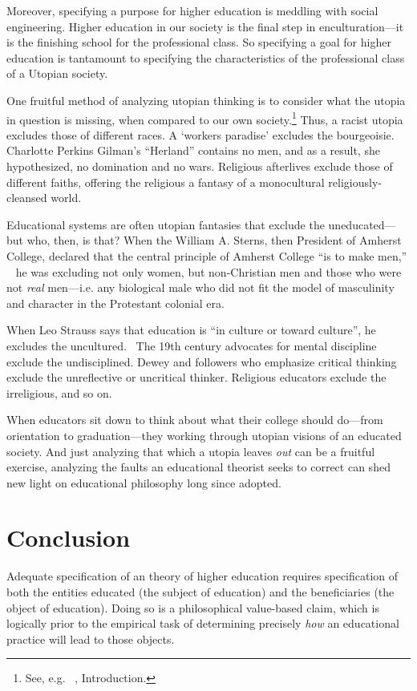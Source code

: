 Moreover, specifying a purpose for higher education is meddling with social engineering. Higher education in our society is the final step in enculturation---it is the finishing school for the professional class. So specifying a goal for higher education is tantamount to specifying the characteristics of the professional class of a Utopian society.

One fruitful method of analyzing utopian thinking is to consider what the utopia in question is missing, when compared to our own society.\footnote{See, e.g. ~\citep{Carey:2000tt}, Introduction.} Thus, a racist utopia excludes those of different races. A `workers paradise' excludes the bourgeoisie. Charlotte Perkins Gilman's ``Herland'' contains no men, and as a result, she hypothesized, no domination and no wars. Religious afterlives exclude those of different faiths, offering the religious a fantasy of a monocultural religiously-cleansed world. 

Educational systems are often utopian fantasies that exclude the uneducated---but who, then, is that? When the William A. Sterns, then President of Amherst College, declared that the central principle of Amherst College ``is to make men,'' ~\citep{Stearns:1859vm} he was excluding not only women, but non-Christian men and those who were not \emph{real} men---i.e. any biological male who did not fit the model of masculinity and character in the Protestant colonial era. 

When Leo Strauss says that education is ``in culture or toward culture'', he excludes the uncultured.~\citep{Strauss:INKysbQ_} The 19th century advocates for mental discipline exclude the undisciplined. Dewey and followers who emphasize critical thinking exclude the unreflective or uncritical thinker. Religious educators exclude the irreligious, and so on.

When educators sit down to think about what their college should do---from orientation to graduation---they working through utopian visions of an educated society. And just analyzing that which a utopia leaves \emph{out} can be a fruitful exercise, analyzing the faults an educational theorist seeks to correct can shed new light on educational philosophy long since adopted.

\section{Conclusion}
\label{conclusion}

Adequate specification of an theory of higher education requires specification of both the entities educated (the subject of education) and the beneficiaries (the object of education). Doing so is a philosophical value-based claim, which is logically prior to the empirical task of determining precisely \emph{how} an educational practice will lead to those objects. 

